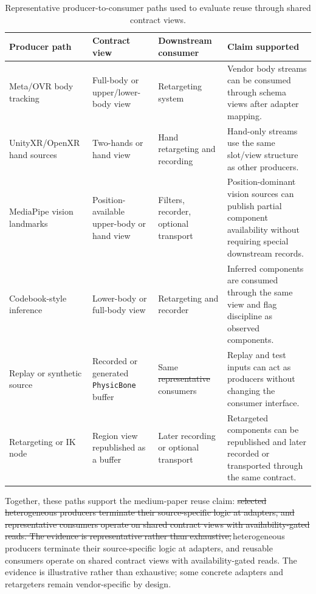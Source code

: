 \documentclass[runningheads]{llncs}
\newcommand{\radd}[1]{\textcolor{revadd}{#1}}
\newcommand{\rdel}[1]{\textcolor{revdel}{\sout{#1}}}
\newcommand{\rrep}[2]{\rdel{#1}\,\radd{#2}}
\newcommand{\radd}[1]{#1}
\newcommand{\rdel}[1]{}
\newcommand{\rrep}[2]{#2}
\begin{document}
\begin{table}[t]
	\caption{Representative producer-to-consumer paths used to evaluate reuse through shared contract views.}\label{tab:producer-consumer}
	\centering
	\scriptsize
	\begin{tabular}{@{}P{28mm}P{24mm}P{28mm}P{39mm}@{}}
		\toprule
		Producer path               & Contract view                                    & Downstream consumer                   & Claim supported                                                                                                           \\
		\midrule
		Meta/OVR body tracking      & Full-body or upper/lower-body view               & Retargeting system                    & Vendor body streams can be consumed through schema views after adapter mapping.                                           \\
		UnityXR/OpenXR hand sources & Two-hands or hand view                           & Hand retargeting and recording        & Hand-only streams use the same slot/view structure as other producers.                                                    \\
		MediaPipe vision landmarks  & Position-available upper-body or hand view       & Filters, recorder, optional transport & Position-dominant vision sources can publish partial component availability without requiring special downstream records. \\
		Codebook-style inference    & Lower-body or full-body view                     & Retargeting and recorder              & Inferred components are consumed through the same view and flag discipline as observed components.                        \\
		Replay or synthetic source  & Recorded or generated \texttt{PhysicBone} buffer & Same \rdel{representative }consumers         & Replay and test inputs can act as producers without changing the consumer interface.                                      \\
		Retargeting or IK node      & Region view republished as a buffer              & Later recording or optional transport & Retargeted components can be republished and later recorded or transported through the same contract.                     \\
		\bottomrule
	\end{tabular}
\end{table}

Together, these paths support the medium-paper reuse claim: \rrep{selected heterogeneous producers terminate their source-specific logic at adapters, and representative consumers operate on shared contract views with availability-gated reads. The evidence is representative rather than exhaustive;}{heterogeneous producers terminate their source-specific logic at adapters, and reusable consumers operate on shared contract views with availability-gated reads. The evidence is illustrative rather than exhaustive;} some concrete adapters and retargeters remain vendor-specific by design.
\end{document}
